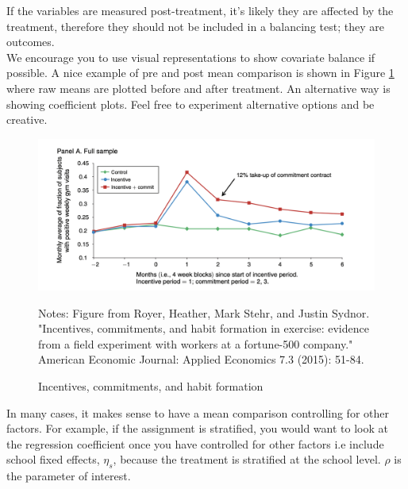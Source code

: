 \documentclass[11pt, oneside]{article}   	%
\begin{document}
If the variables are measured post-treatment, it's likely they are affected by the treatment, therefore they should not be included in a balancing test; they are outcomes. \\

We encourage you to use visual representations to show covariate balance if possible. A nice example of pre and post mean comparison is shown in Figure \ref{fig:aej} where raw means are plotted before and after treatment. An alternative way is showing coefficient plots. Feel free to experiment alternative options and be creative.

\begin{figure} [H]
\begin{center}
\caption{\label{fig:aej} Incentives, commitments, and habit formation}
\includegraphics[width=120 mm, height=60 mm]{output/figures/Habit_Formation_Exercise.png} 
\end{center}
\vspace{0.1cm}
\par
\begin{minipage}{ \linewidth}
\baselineskip10pt
\scriptsize{Notes: Figure from Royer, Heather, Mark Stehr, and Justin Sydnor. "Incentives, commitments, and habit formation in exercise: evidence from a field experiment with workers at a fortune-500 company." American Economic Journal: Applied Economics 7.3 (2015): 51-84.}
\end{minipage}
\end{figure}





In many cases, it makes sense to have a mean comparison controlling for other factors. For example, if the assignment is stratified, you would want to look at the regression coefficient once you have controlled for other factors i.e include school fixed effects, $ \eta_s $, because the treatment is stratified at the school level.  $\rho$ is the parameter of interest.
\end{document}

